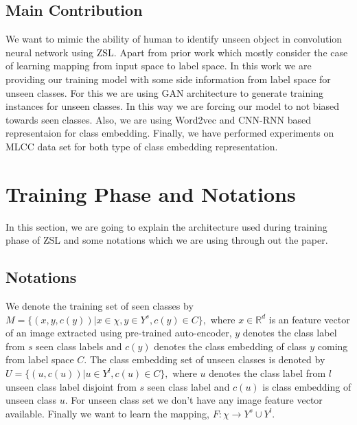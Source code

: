 \documentclass[11pt, conference, english]{IEEEtran}
\theoremstyle{plain}
\theoremstyle{definition}
\theoremstyle{remark}
\begin{document}
	\subsection{Main Contribution}
	We want to mimic the ability of human to identify unseen object in convolution neural network using ZSL. Apart from prior work which mostly consider the case of learning mapping from input space to label space. In this work we are providing our training model with some side information from label space for unseen classes. For this we are using GAN architecture to generate training instances for unseen classes. In this way we are forcing our model to not biased towards seen classes. Also, we are using Word2vec and CNN-RNN based representaion for class embedding. Finally, we have performed experiments on MLCC data set for both type of class embedding representation.
	\section{Training Phase and Notations}
	In this section, we are going to explain the architecture used during training phase of ZSL and some notations which we are using through out the paper. 
	\subsection{Notations}
	We denote the training set of seen classes by $M=\{(x,y,c(y))|x\in \chi, y \in Y^{s}, c(y) \in C \},$
	where $x\in \mathbb{R}^{d}$ is an feature vector of an image extracted using pre-trained auto-encoder, $y$ denotes the class label from $s$ seen class labels and $c(y)$ denotes the class embedding of class $y$ coming from label space $C$. The class embedding set of unseen classes is denoted by $U=\{(u,c(u))|u \in Y^l,c(u)\in C\},$ where $u$ denotes the class label  from $l$ unseen class label disjoint from $s$ seen class label and $c(u)$ is class embedding of unseen class $u$. For unseen class set we don't have any image feature vector available. Finally we want to learn the mapping,
	$F:\chi \rightarrow Y^s \cup Y^l$.
	 
\end{document}
